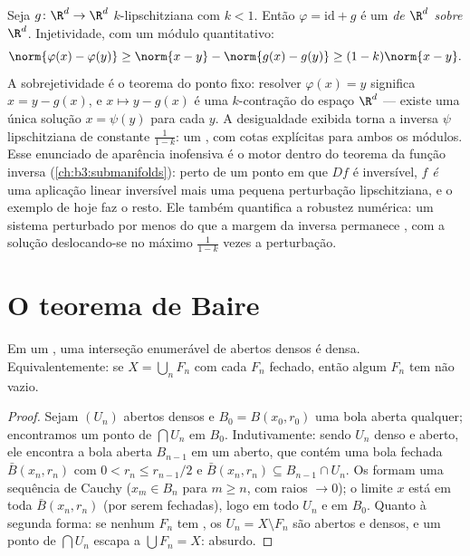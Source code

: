 \begin{example}
\label{ex:b3:complete:perturbident}
Seja $g \colon \R^d \to \R^d$ $k$-lipschitziana com $k < 1$. Então $\varphi = \mathrm{id} + g$ é um
\emph{ de $\R^d$ sobre $\R^d$}. Injetividade, com um
módulo quantitativo:
\[
\norm{\varphi(x) - \varphi(y)} \geq \norm{x - y} -
\norm{g(x) - g(y)} \geq (1 - k)\norm{x - y} .
\]
A sobrejetividade é o teorema do ponto fixo: resolver $\varphi(x) = y$ significa
$x = y - g(x)$, e $x \mapsto y -
g(x)$ é uma $k$-contração do espaço  $\R^d$ ---
existe uma única solução $x = \psi(y)$ para cada $y$. A desigualdade exibida
torna a inversa $\psi$ lipschitziana de constante $\frac1{1-k}$: um
, com cotas explícitas para ambos os módulos. Esse
enunciado de aparência inofensiva é o motor dentro do teorema da função
inversa (\cref{ch:b3:submanifolds}): perto de um ponto em que $Df$ é
inversível, $f$ \emph{é} uma aplicação linear inversível mais uma
pequena perturbação lipschitziana, e o exemplo de hoje faz o resto. Ele
também quantifica a robustez numérica: um sistema perturbado por menos
do que a margem da inversa permanece , com a solução deslocando-se
no máximo $\frac{1}{1-k}$ vezes a perturbação.
\end{example}

\section{O teorema de Baire}

\begin{theorem}[Baire]\label{thm:b3:complete:baire}
Em um , uma interseção enumerável de abertos
densos é densa. Equivalentemente: se $X = \bigcup_{n}F_n$ com cada $F_n$ fechado,
então algum $F_n$ tem  não vazio.
\end{theorem}

\begin{proof}
Sejam $(U_n)$ abertos densos e $B_0 = B(x_0, r_0)$ uma bola aberta qualquer;
encontramos um ponto de $\bigcap U_n$ em $B_0$. Indutivamente: sendo
$U_{n}$ denso e aberto, ele encontra a bola aberta $B_{n-1}$ em um
aberto, que contém uma bola fechada $\bar B(x_n, r_n)$ com $0 < r_n \leq r_{n-1}/2$ e $\bar B(x_n, r_n) \subseteq
B_{n-1}\cap U_n$. Os 
formam uma sequência de Cauchy ($x_m \in
B_n$ para $m \geq n$, com raios $\to 0$);
o limite $x$ está em toda $\bar B(x_n, r_n)$ (por serem fechadas), logo em todo
$U_n$ e em $B_0$. Quanto à segunda forma: se nenhum $F_n$ tem
, os $U_n = X \setminus F_n$ são abertos e densos, e um ponto de $\bigcap U_n$ escapa a
$\bigcup F_n = X$: absurdo.
\end{proof}

